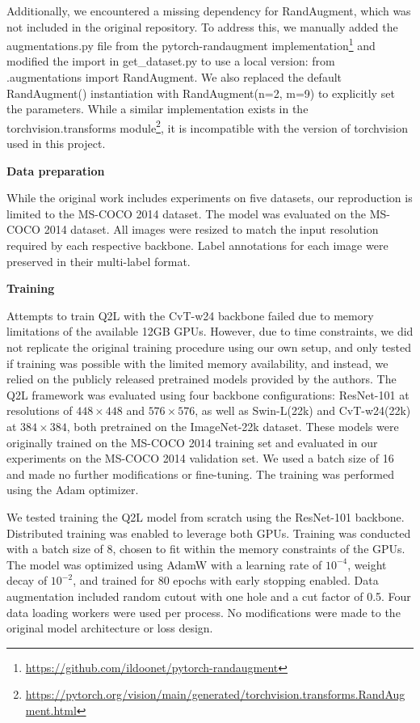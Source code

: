 \documentclass[lettersize,journal]{IEEEtran}
\renewcommand{\paragraph}[1]{%
  \vspace{1.5ex}\textbf{#1}\quad
}
\begin{document}
Additionally, we encountered a missing dependency for RandAugment, which was not included in the original repository. To address this, we manually added the augmentations.py file from the pytorch-randaugment implementation\footnote{\url{https://github.com/ildoonet/pytorch-randaugment}} and modified the import in get\_dataset.py to use a local version: from .augmentations import RandAugment. We also replaced the default RandAugment() instantiation with RandAugment(n=2, m=9) to explicitly set the parameters. While a similar implementation exists in the torchvision.transforms module\footnote{\url{https://pytorch.org/vision/main/generated/torchvision.transforms.RandAugment.html}}, it is incompatible with the version of torchvision used in this project.

\paragraph{Data preparation}
While the original work includes experiments on five datasets, our reproduction is limited to the MS-COCO 2014 dataset. The model was evaluated on the MS-COCO 2014 dataset. All images were resized to match the input resolution required by each respective backbone. Label annotations for each image were preserved in their multi-label format.

\paragraph{Training}
Attempts to train Q2L with the CvT-w24 backbone failed due to memory limitations of the available 12GB GPUs. However, due to time constraints, we did not replicate the original training procedure using our own setup, and only tested if training was possible with the limited memory availability, and instead, we relied on the publicly released pretrained models provided by the authors. The Q2L framework was evaluated using four backbone configurations: ResNet-101 at resolutions of $448\times448$ and $576\times576$, as well as Swin-L(22k) and CvT-w24(22k) at $384\times384$, both pretrained on the ImageNet-22k \cite{imagenet} dataset. These models were originally trained on the MS-COCO 2014 training set and evaluated in our experiments on the MS-COCO 2014 validation set. We used a batch size of 16 and made no further modifications or fine-tuning. The training was performed using the Adam optimizer. 


We tested training the Q2L model from scratch using the ResNet-101 backbone. Distributed training was enabled to leverage both GPUs. Training was conducted with a batch size of 8, chosen to fit within the memory constraints of the GPUs. The model was optimized using AdamW with a learning rate of $10^{-4}$, weight decay of $10^{-2}$, and trained for 80 epochs with early stopping enabled. Data augmentation included random cutout with one hole and a cut factor of 0.5. Four data loading workers were used per process. No modifications were made to the original model architecture or loss design.
\end{document}
